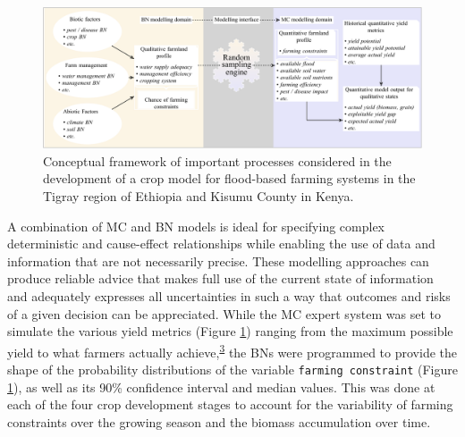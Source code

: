 \documentclass[]{elsarticle} %
\begin{document}
\begin{figure}[!h]

{\centering \includegraphics[width=1\linewidth,]{Modelling_FBFS_files/figure-latex/fig3-plot-1} 

}

\caption{Conceptual framework of important processes considered in the development of a crop model for flood-based farming systems in the Tigray region of Ethiopia and Kisumu County in Kenya.}\label{fig:fig3}
\end{figure}

A combination of MC and BN models is ideal for specifying complex deterministic and cause-effect relationships while enabling the use of data and information that are not necessarily precise. These modelling approaches can produce reliable advice that makes full use of the current state of information and adequately expresses all uncertainties in such a way that outcomes and risks of a given decision can be appreciated. While the MC expert system was set to simulate the various yield metrics (Figure \ref{fig:fig3}) ranging from the maximum possible yield to what farmers actually achieve,\textsuperscript{\protect\hyperlink{ref-VanIttersum_et_al_2013}{3}} the BNs were programmed to provide the shape of the probability distributions of the variable \texttt{farming\ constraint} (Figure \ref{fig:fig3}), as well as its 90\% confidence interval and median values. This was done at each of the four crop development stages to account for the variability of farming constraints over the growing season and the biomass accumulation over time.
\end{document}
